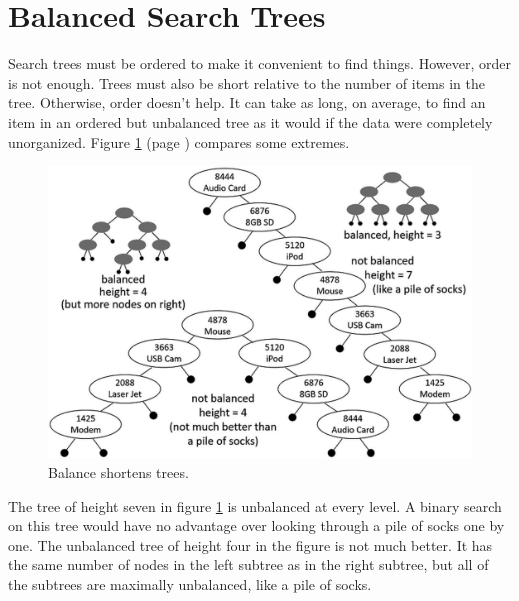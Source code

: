 \section{Balanced Search Trees}

Search trees must be ordered to make it convenient to find things.
However, order is not enough.
Trees must also be short relative to the number of items in the tree.
Otherwise, order doesn't help. %
It can take as long, on average, to find an item
in an ordered but unbalanced tree as it would
if the data were completely unorganized.
Figure \ref{fig:unbalanced-trees} (page \pageref{fig:unbalanced-trees})
compares some extremes.

\begin{figure}
\begin{center}
\includegraphics[scale=1]{images-cmyk/unbalanced-trees}
\end{center}
\caption{Balance shortens trees.}
\label{fig:unbalanced-trees}
\end{figure}

The tree of height seven in
figure \ref{fig:unbalanced-trees}
is unbalanced at every level.
A binary search on this tree would have no advantage over
looking through a pile of socks one by one.
The unbalanced tree of height four in the figure is not much better.
It has the same number of nodes in the left subtree as in the right subtree,
but all of the subtrees are maximally unbalanced, like a pile of socks.

